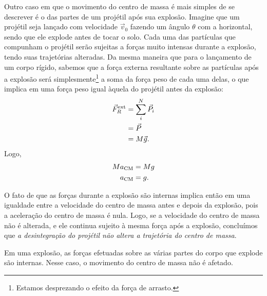 Outro caso em que o movimento do centro de massa é mais simples de se descrever é o das partes de um projétil após sua explosão. Imagine que um projétil seja lançado com velocidade $\vec{v}_0$ fazendo um ângulo $\theta$ com a horizontal, sendo que ele explode antes de tocar o solo. Cada uma das partículas que compunham o projétil serão sujeitas a forças muito intensas durante a explosão, tendo suas trajetórias alteradas. Da mesma maneira que para o lançamento de um corpo rígido, sabemos que a força externa resultante sobre as partículas após a explosão será simplesmente\footnote{Estamos desprezando o efeito da força de arrasto.} a soma da força peso de cada uma delas, o que implica em uma força peso igual àquela do projétil antes da explosão:
\begin{align}
	\vec{F}_{R}^{\rm{ext}} &= \sum_i^N \vec{P}_i \\
		&= \vec{P} \\
		&= M\vec{g}.
\end{align}
%
Logo,
\begin{align}
    M a_{\rm{CM}} &= M g \\
    a_{\rm{CM}} &= g.
\end{align}

O fato de que as forças durante a explosão são internas implica então em uma igualdade entre a velocidade do centro de massa antes e depois da explosão, pois a aceleração do centro de massa é nula. Logo, se a velocidade do centro de massa não é alterada, e ele continua sujeito à mesma força após a explosão, concluímos que \emph{a desintegração do projétil não altera a trajetória do centro de massa}.

\begin{marginfigure}[-3cm]
\centering
{}
\caption{Em uma explosão, as forças efetuadas sobre as várias partes do corpo que explode são internas. Nesse caso, o movimento do centro de massa não é afetado.\label{Fig:ExplosaoProjetil}}
\end{marginfigure}

